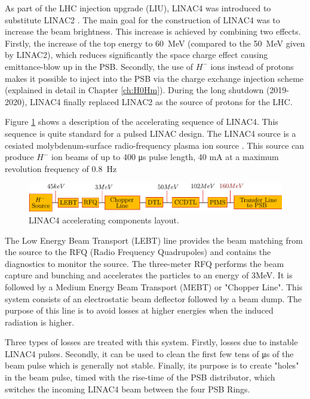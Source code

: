 As part of the LHC injection upgrade (LIU), LINAC4 was introduced to substitute LINAC2  \parencite*[]{ref:LIU}. The main goal for the construction of LINAC4 was to increase the beam brightness. This increase is achieved by combining two effects. Firstly, the increase of the top energy to \SIlist[]{60}{\mega \electronvolt} (compared to the \SI[]{50}{\mega \electronvolt} given by LINAC2), which reduces significantly the space charge effect causing emittance-blow up in the PSB. Secondly, the use of $H^{-}$ ions instead of protons makes it possible to inject into the PSB via the charge exchange injection scheme (explained in detail in Chapter \ref{ch:H0Hm}). During the long shutdown (2019-2020), LINAC4 finally replaced LINAC2 as the source of protons for the LHC. 

Figure \ref{fig:Linac4_acc} shows a description of the accelerating sequence of LINAC4. This sequence is quite standard for a pulsed LINAC design. The LINAC4 source is a cesiated molybdenum-surface radio-frequency plasma ion source \parencite*[][]{ref:SourceCite}. This source can produce $H^{-}$ ion beams of up to 400 \si[]{\micro \second} pulse length, 40 \si[]{\milli \ampere} at a maximum revolution frequency of \SI[]{0.8}{\hertz}

\begin{figure}[h]
    \centering
    \includegraphics[width=1.0\columnwidth]{Linac4_AcceleratingPart/Linac4_acc.pdf}
    \caption{LINAC4 accelerating components layout. }
    \label{fig:Linac4_acc}
\end{figure}

The Low Energy Beam Transport (LEBT) line provides the beam matching from the source to the RFQ (Radio Frequency Quadrupoles) and contains the diagnostics to monitor the source. The three-meter RFQ performs the beam capture and bunching and accelerates the particles to an energy of 3\si[]{\mega \electronvolt}. It is followed by a Medium Energy Beam Transport (MEBT) or "Chopper Line". This system consists of an electrostatic beam deflector followed by a beam dump. The purpose of this line is to avoid losses at higher energies when the induced radiation is higher.


Three types of losses are treated with this system. Firstly, losses due to instable LINAC4 pulses. Secondly, it can be used to clean the first few tens of \si[]{\micro \second} of the beam pulse which is generally not stable. Finally, its purpose is to create "holes" in the beam pulse, timed with the rise-time of the PSB distributor, which switches the incoming LINAC4 beam between the four PSB Rings.  

